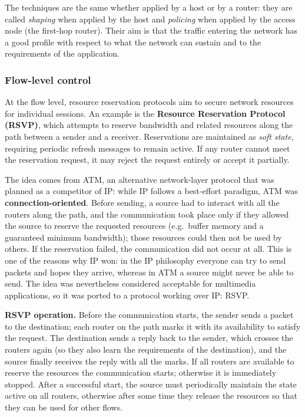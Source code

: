 \documentclass[11pt,a4paper,openany]{report}
\begin{document}
The techniques are the same whether applied by a host or by a router: they are called \emph{shaping} when applied by the host and \emph{policing} when applied by the access node (the first-hop router). Their aim is that the traffic entering the network has a good profile with respect to what the network can sustain and to the requirements of the application.

\subsubsection*{Flow-level control}

At the flow level, resource reservation protocols aim to secure network resources for individual sessions. An example is the \textbf{Resource Reservation Protocol (RSVP)}, which attempts to reserve bandwidth and related resources along the path between a sender and a receiver. Reservations are maintained as \emph{soft state}, requiring periodic refresh messages to remain active. If any router cannot meet the reservation request, it may reject the request entirely or accept it partially.

The idea comes from ATM, an alternative network-layer protocol that was planned as a competitor of IP: while IP follows a best-effort paradigm, ATM was \textbf{connection-oriented}. Before sending, a source had to interact with all the routers along the path, and the communication took place only if they allowed the source to reserve the requested resources (e.g.\ buffer memory and a guaranteed minimum bandwidth); those resources could then not be used by others. If the reservation failed, the communication did not occur at all. This is one of the reasons why IP won: in the IP philosophy everyone can try to send packets and hopes they arrive, whereas in ATM a source might never be able to send. The idea was nevertheless considered acceptable for multimedia applications, so it was ported to a protocol working over IP: RSVP.

\textbf{RSVP operation.} Before the communication starts, the sender sends a packet to the destination; each router on the path marks it with its availability to satisfy the request. The destination sends a reply back to the sender, which crosses the routers again (so they also learn the requirements of the destination), and the source finally receives the reply with all the marks. If all routers are available to reserve the resources the communication starts; otherwise it is immediately stopped. After a successful start, the source must periodically maintain the state active on all routers, otherwise after some time they release the resources so that they can be used for other flows.
\end{document}

